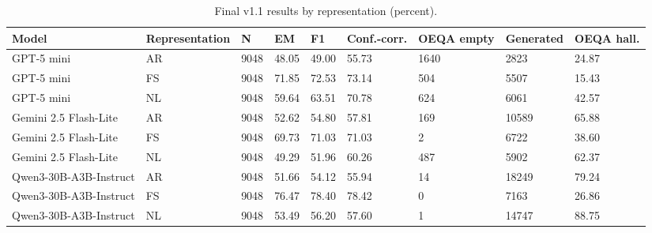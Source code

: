 \begin{table}[t]
\centering
\small
\begin{tabular}{lllllllll}
\toprule
Model & Representation & N & EM & F1 & Conf.-corr. & OEQA empty & Generated & OEQA hall. \\
\midrule
GPT-5 mini & AR & 9048 & 48.05 & 49.00 & 55.73 & 1640 & 2823 & 24.87 \\
GPT-5 mini & FS & 9048 & 71.85 & 72.53 & 73.14 & 504 & 5507 & 15.43 \\
GPT-5 mini & NL & 9048 & 59.64 & 63.51 & 70.78 & 624 & 6061 & 42.57 \\
Gemini 2.5 Flash-Lite & AR & 9048 & 52.62 & 54.80 & 57.81 & 169 & 10589 & 65.88 \\
Gemini 2.5 Flash-Lite & FS & 9048 & 69.73 & 71.03 & 71.03 & 2 & 6722 & 38.60 \\
Gemini 2.5 Flash-Lite & NL & 9048 & 49.29 & 51.96 & 60.26 & 487 & 5902 & 62.37 \\
Qwen3-30B-A3B-Instruct & AR & 9048 & 51.66 & 54.12 & 55.94 & 14 & 18249 & 79.24 \\
Qwen3-30B-A3B-Instruct & FS & 9048 & 76.47 & 78.40 & 78.42 & 0 & 7163 & 26.86 \\
Qwen3-30B-A3B-Instruct & NL & 9048 & 53.49 & 56.20 & 57.60 & 1 & 14747 & 88.75 \\
\bottomrule
\end{tabular}
\caption{Final v1.1 results by representation (percent).}
\label{tab:core-v11-representation}
\end{table}
